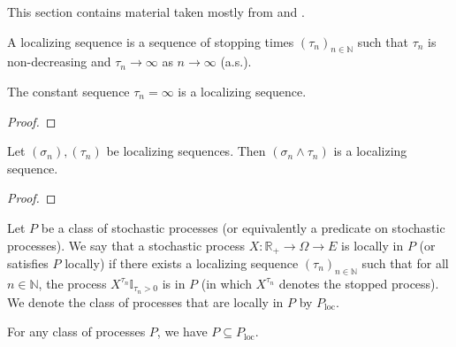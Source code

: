 This section contains material taken mostly from \cite[Chapters 10 and 18]{kallenberg2021} and \cite{almostsuremath}.


\begin{definition}\label{def:localizingSequence}
  \leanok
A localizing sequence is a sequence of stopping times $(\tau_n)_{n \in \mathbb{N}}$ such that $\tau_n$ is non-decreasing and $\tau_n \to \infty$ as $n \to \infty$ (a.s.).
\end{definition}


\begin{lemma}\label{lem:localizingSequence_const_top}
  \leanok
The constant sequence $\tau_n = \infty$ is a localizing sequence.
\end{lemma}

\begin{proof}\leanok

\end{proof}


\begin{lemma}\label{lem:localizingSequence_min}
  \leanok
Let $(\sigma_n), (\tau_n)$ be localizing sequences.
Then $(\sigma_n \wedge \tau_n)$ is a localizing sequence.
\end{lemma}

\begin{proof}\leanok

\end{proof}


\begin{definition}\label{def:locally}
  \leanok
Let $P$ be a class of stochastic processes (or equivalently a predicate on stochastic processes).
We say that a stochastic process $X : \mathbb{R}_+ \to \Omega \to E$ is locally in $P$ (or satisfies $P$ locally) if there exists a localizing sequence $(\tau_n)_{n \in \mathbb{N}}$ such that for all $n \in \mathbb{N}$, the process $X^{\tau_n}\mathbb{I}_{\tau_n > 0}$ is in $P$ (in which $X^{\tau_n}$ denotes the stopped process).
We denote the class of processes that are locally in $P$ by $P_{\mathrm{loc}}$.
\end{definition}


\begin{lemma}\label{lem:implies_locally}
  \leanok
For any class of processes $P$, we have $P \subseteq P_{\mathrm{loc}}$.
\end{lemma}

